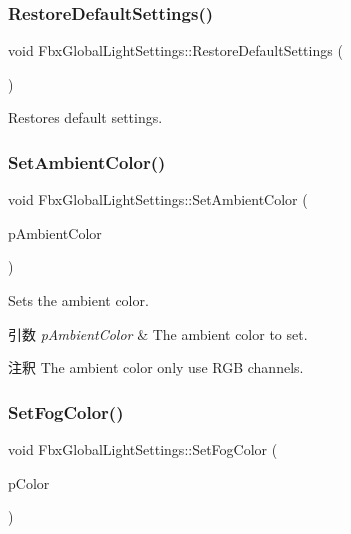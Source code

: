 \subsubsection{\texorpdfstring{Restore\+Default\+Settings()}{RestoreDefaultSettings()}}
{\footnotesize\ttfamily void Fbx\+Global\+Light\+Settings\+::\+Restore\+Default\+Settings (\begin{DoxyParamCaption}{ }\end{DoxyParamCaption})}



Restores default settings. 

\mbox{\label{class_fbx_global_light_settings_adad3dc92c22ba63443bf2421e6e257cc}} 
\subsubsection{\texorpdfstring{Set\+Ambient\+Color()}{SetAmbientColor()}}
{\footnotesize\ttfamily void Fbx\+Global\+Light\+Settings\+::\+Set\+Ambient\+Color (\begin{DoxyParamCaption}\item[{\hyperlink{class_fbx_color}{Fbx\+Color}}]{p\+Ambient\+Color }\end{DoxyParamCaption})}

Sets the ambient color. 
\begin{DoxyParams}{引数}
{\em p\+Ambient\+Color} & The ambient color to set. \\
\hline
\end{DoxyParams}
\begin{DoxyRemark}{注釈}
The ambient color only use R\+GB channels. 
\end{DoxyRemark}
\mbox{\label{class_fbx_global_light_settings_a021ab12c926a62587c8e97b579f3d1d6}} 
\subsubsection{\texorpdfstring{Set\+Fog\+Color()}{SetFogColor()}}
{\footnotesize\ttfamily void Fbx\+Global\+Light\+Settings\+::\+Set\+Fog\+Color (\begin{DoxyParamCaption}\item[{\hyperlink{class_fbx_color}{Fbx\+Color}}]{p\+Color }\end{DoxyParamCaption})}

